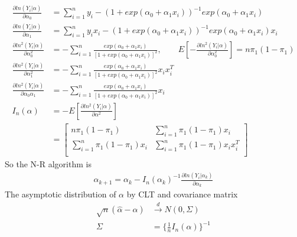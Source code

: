 \documentclass[11pt]{article} %
\begin{document}
	\begin{align*}
		\frac{\partial ln (Y_i|\alpha)}{\partial \alpha_0}  &= \sum_{i=1}^n y_i - \left(1 + exp(\alpha_0 + \alpha_1 x_i) \right)^{-1} exp(\alpha_0 + \alpha_1 x_i)\\
		\frac{\partial ln (Y_i|\alpha)}{\partial \alpha_1}  &= \sum_{i=1}^n y_i x_i- \left(1 + exp(\alpha_0 + \alpha_1 x_i) \right)^{-1} exp(\alpha_0 + \alpha_1 x_i) x_i\\
		\frac{\partial ln^2 (Y_i|\alpha)}{\partial \alpha_0^2}  &=- \sum_{i=1}^n \frac{exp(\alpha_0 + \alpha_1 x_i)}{[1+ exp(\alpha_0 + \alpha_1 x_i)]^2}, \qquad E[-\frac{\partial ln^2 (Y_i|\alpha)}{\partial \alpha_0^2}] = n \pi_1 (1-\pi_1) \\
		\frac{\partial ln^2 (Y_i|\alpha)}{\partial \alpha_1^2}  &=- \sum_{i=1}^n \frac{exp(\alpha_0 + \alpha_1 x_i)}{[1+ exp(\alpha_0 + \alpha_1 x_i)]^2} x_ix_i^T \\
		\frac{\partial ln^2 (Y_i|\alpha)}{\partial \alpha_0\alpha_1}  &=- \sum_{i=1}^n \frac{exp(\alpha_0 + \alpha_1 x_i)}{[1+ exp(\alpha_0 + \alpha_1 x_i)]^2} x_i\\
		I_n(\alpha) &= -E[ \frac{\partial ln^2 (Y_i|\alpha)}{\partial \alpha^2}]\\
		&= \begin{bmatrix}
			n \pi_1 (1-\pi_1) &   \sum_{i=1}^n \pi_1 (1-\pi_1)x_i\\
			\sum_{i=1}^n \pi_1 (1-\pi_1)x_i &  \sum_{i=1}^n \pi_1 (1-\pi_1)x_ix_i^T\\
		\end{bmatrix}
	\end{align*}  
	So the N-R algorithm is 
	\begin{align*}
		\alpha_{k+1} = \alpha_{k} - I_n(\alpha_k)^{-1} \frac{\partial ln(Y_i|\alpha_k)}{\partial \alpha_k}
	\end{align*}      
	The asymptotic distribution of $\alpha$ by CLT and covariance matrix 
	\begin{align*}
		\sqrt{n} (\hat{\alpha} - \alpha) & \xrightarrow[]{d} N \left(0, \Sigma \right) \\
		\Sigma & = \{ \frac{1}{n} I_n(\alpha) \}^{-1}
	\end{align*} 
\end{document}
